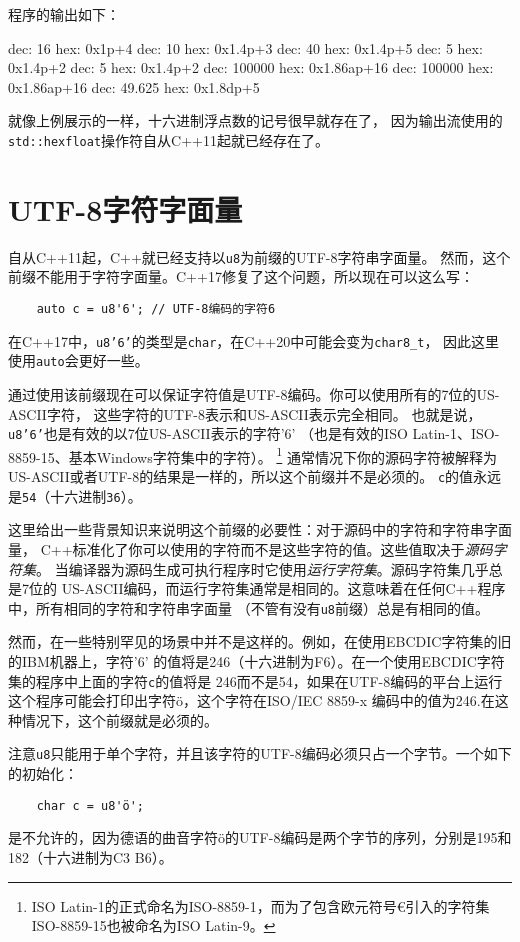 程序的输出如下：
\begin{blacklisting}
    dec:     16  hex: 0x1p+4
    dec:     10  hex: 0x1.4p+3
    dec:     40  hex: 0x1.4p+5
    dec:      5  hex: 0x1.4p+2
    dec:      5  hex: 0x1.4p+2
    dec: 100000  hex: 0x1.86ap+16
    dec: 100000  hex: 0x1.86ap+16
    dec: 49.625  hex: 0x1.8dp+5
\end{blacklisting}
就像上例展示的一样，十六进制浮点数的记号很早就存在了，
因为输出流使用的\texttt{std::hexfloat}操作符自从C++11起就已经存在了。

\section{UTF-8字符字面量}\label{ch8.6}
自从C++11起，C++就已经支持以\texttt{u8}为前缀的UTF-8字符串字面量。
然而，这个前缀不能用于字符字面量。C++17修复了这个问题，所以现在可以这么写：
\begin{lstlisting}
    auto c = u8'6'; // UTF-8编码的字符6
\end{lstlisting}
在C++17中，\texttt{u8'6'}的类型是\texttt{char}，在C++20中可能会变为\texttt{char8\_t}，
因此这里使用\texttt{auto}会更好一些。

通过使用该前缀现在可以保证字符值是UTF-8编码。你可以使用所有的7位的US-ASCII字符，
这些字符的UTF-8表示和US-ASCII表示完全相同。
也就是说，\texttt{u8'6'}也是有效的以7位US-ASCII表示的字符'6'
（也是有效的ISO Latin-1、ISO-8859-15、基本Windows字符集中的字符）。
\footnote{ISO Latin-1的正式命名为ISO-8859-1，而为了包含欧元符号€引入的字符集
ISO-8859-15也被命名为ISO Latin-9。}
通常情况下你的源码字符被解释为US-ASCII或者UTF-8的结果是一样的，所以这个前缀并不是必须的。
\texttt{c}的值永远是\texttt{54}（十六进制\texttt{36}）。

这里给出一些背景知识来说明这个前缀的必要性：对于源码中的字符和字符串字面量，
C++标准化了你可以使用的字符而不是这些字符的值。这些值取决于\emph{源码字符集}。
当编译器为源码生成可执行程序时它使用\emph{运行字符集}。源码字符集几乎总是7位的
US-ASCII编码，而运行字符集通常是相同的。这意味着在任何C++程序中，所有相同的字符和字符串字面量
（不管有没有\texttt{u8}前缀）总是有相同的值。

然而，在一些特别罕见的场景中并不是这样的。例如，在使用EBCDIC字符集的旧的IBM机器上，字符'6'
的值将是246（十六进制为F6）。在一个使用EBCDIC字符集的程序中上面的字符\texttt{c}的值将是
246而不是54，如果在UTF-8编码的平台上运行这个程序可能会打印出字符ö，这个字符在ISO/IEC 8859-x
编码中的值为246.在这种情况下，这个前缀就是必须的。

注意\texttt{u8}只能用于单个字符，并且该字符的UTF-8编码必须只占一个字节。一个如下的初始化：
\begin{lstlisting}
    char c = u8'ö';
\end{lstlisting}
是不允许的，因为德语的曲音字符ö的UTF-8编码是两个字节的序列，分别是195和182（十六进制为C3 B6）。

